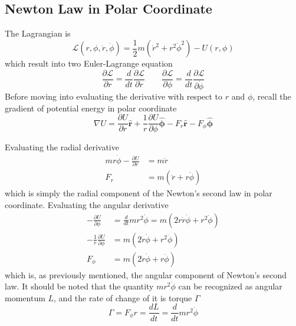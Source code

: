 \documentclass[../../../main.tex]{subfiles}
\begin{document}
\subsection*{Newton Law in Polar Coordinate}
The Lagrangian is 
\begin{equation*}
  \mathcal{L}(r,\phi,\dot{r},\dot{\phi})=\frac{1}{2}m(\dot{r}^2+r^2\dot{\phi}^2)-U(r,\phi)
\end{equation*}
which result into two Euler-Lagrange equation
\begin{equation*}
  \frac{\partial\mathcal{L}}{\partial r}=\frac{d}{dt}\frac{\partial\mathcal{L}}{\partial \dot{r}}\qquad\frac{\partial\mathcal{L}}{\partial \phi}=\frac{d}{dt}\frac{\partial\mathcal{L}}{\partial \dot{\phi}}
\end{equation*}
Before moving into evaluating the derivative with respect to $r$ and $\phi$, recall the gradient of potential energy in polar coordinate
\begin{equation*}
  \nabla U=\frac{\partial U}{\partial r}\mathbf{\hat{{r}}}+ \frac{1}{r}\frac{\partial U}{\partial \phi}\boldsymbol{\hat{\phi}}-F_r\mathbf{\hat{r}}-F_{\phi}\boldsymbol{\hat{\phi}}
\end{equation*} 

Evaluating the radial derivative
\begin{align*}
  mr\dot{\phi}-\frac{\partial U}{\partial r}&=m\ddot{r}\\
  F_r&=m(\ddot{r}+r\dot{\phi})
\end{align*}
which is simply the radial component of the Newton's second law in polar coordinate. 
Evaluating the angular derivative
\begin{align*}
  -\frac{\partial U}{\partial \phi}&=\frac{d}{dt}mr^2\dot{\phi}=m(2r\dot{r}\dot{\phi}+r^2\ddot{\phi})\\
  -\frac{1}{r}\frac{\partial U}{\partial \phi}&=m(2\dot{r}\dot{\phi}+r^2\ddot{\phi})\\
  F_\phi&=m(2\dot{r}\dot{\phi}+r\ddot{\phi})
\end{align*}
which is, as previously mentioned, the angular component of Newton's second law. It should be noted that the quantity $mr^2\dot{\phi}$ can be recognized as angular momentum $L$, and the rate of change of it is torque $\Gamma$
\begin{equation*}
  \Gamma=F_\phi r=\frac{dL}{dt}=\frac{d}{dt}mr^2\dot{\phi}
\end{equation*} 
\end{document}
